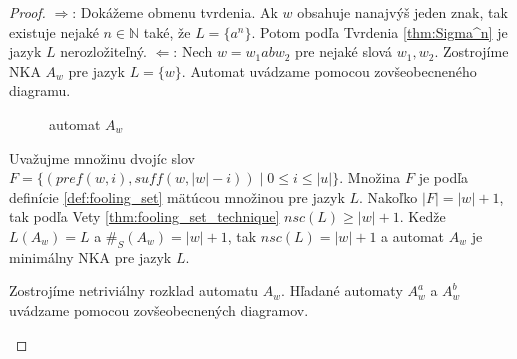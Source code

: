 \begin{proof}
$ \Rightarrow $: Dokážeme obmenu tvrdenia. Ak $ w $ obsahuje nanajvýš jeden znak, tak existuje nejaké $ n \in \mathbb{N} $ také, že $ L = \lbrace a^n \rbrace $. Potom podľa Tvrdenia \ref{thm:Sigma^n} je jazyk $ L $ nerozložiteľný.
$ \Leftarrow $: Nech $ w = w_1abw_2 $ pre nejaké slová $ w_1,w_2 $. Zostrojíme NKA $ A_w $ pre jazyk $ L = \lbrace w \rbrace $. Automat uvádzame pomocou zovšeobecneného diagramu.

\begin{figure}[H]
\centering
{}
\caption{automat $ A_w $}
\end{figure}

Uvažujme množinu dvojíc slov $ F = \lbrace (pref(w,i),suff(w,|w|-i)) \; | \; 0 \leq i \leq |u| \rbrace $. Množina $ F $ je podľa definície \ref{def:fooling_set} mätúcou množinou pre jazyk $ L $. Nakoľko $ |F| = |w|+1 $, tak podľa Vety \ref{thm:fooling_set_technique} $ nsc(L) \geq |w|+1 $. Kedže $ L(A_w) = L $ a $ \#_S(A_w) = |w|+1 $, tak $ nsc(L) = |w|+1 $ a automat $ A_w $ je minimálny NKA pre jazyk $ L $.
\par
Zostrojíme netriviálny rozklad automatu $ A_w $. Hľadané automaty $ A^a_w $ a $ A^b_w $ uvádzame pomocou zovšeobecnených diagramov.

\begin{figure}[H]
\centering
{}


\end{figure}
\end{proof}
